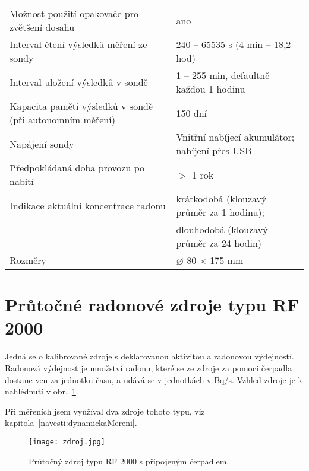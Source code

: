 \begin{table}[H]
\begin{tabular}{p{}p{}}
Možnost použití opakovače pro zvětšení dosahu            & ano                                                                       \\
Interval čtení výsledků měření ze sondy                  & 240 – 65535 s (4 min – 18,2 hod)                                          \\
Interval uložení výsledků v sondě                        & 1 – 255 min, defaultně každou 1 hodinu                                    \\
Kapacita paměti výsledků v sondě (při autonomním měření) & 150 dní                                                                   \\
Napájení sondy                                           & Vnitřní nabíjecí akumulátor; nabíjení přes USB                            \\
Předpokládaná doba provozu po nabití                     & $>$ 1 rok                                                        \\
Indikace aktuální koncentrace radonu                     & krátkodobá (klouzavý průměr za 1 hodinu);                                  \\
                                                         & dlouhodobá (klouzavý průměr za 24 hodin)                                  \\
Rozměry                                                  & $\diameter$ 80 $\times$ 175 mm                                                   \\
\bottomrule
\end{tabular}
\end{table}

\section{Průtočné radonové zdroje typu RF 2000}\label{navesti:radon_zdroje}

Jedná se o kalibrované zdroje s deklarovanou aktivitou  a radonovou výdejností. Radonová výdejnost je množství radonu, které se ze zdroje za pomoci čerpadla dostane ven za jednotku času, a udává se v jednotkách v \si{Bq/s}. Vzhled zdroje je k nahlédnutí v obr.~\ref{fig:radon_zdroj}.

Při měřeních jsem využíval dva zdroje tohoto typu, viz kapitola~\ref{navesti:dynamickaMereni}.
\begin{figure}[ht]
    \centering
    \texttt{[image: zdroj.jpg]}
    \caption{Průtočný zdroj typu RF 2000 s připojeným čerpadlem.}
    \label{fig:radon_zdroj}
\end{figure}
